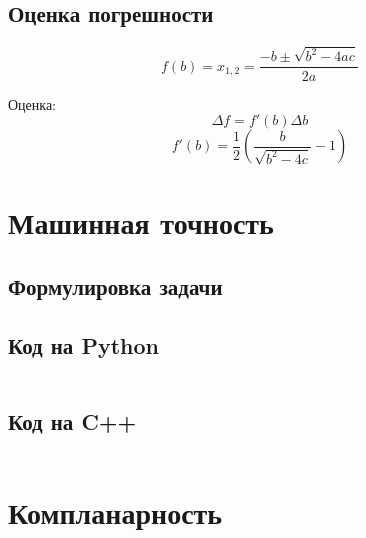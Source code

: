 \documentclass[a4paper,12pt]{article}
\newenvironment{longlisting}{\captionsetup{type=listing}}{}
\begin{document}
\subsection{Оценка погрешности}

$$f(b) = x_{1,2} = \frac{-b \pm \sqrt{b^2-4ac}}{2a}$$

Оценка:
$$\Delta f = f'(b)\Delta b$$
$$f'(b) = \frac{1}{2}(\frac{b}{\sqrt{b^2-4c}}-1)$$



\section{Машинная точность}
\subsection{Формулировка задачи}
\subsection{Код на Python}

\begin{longlisting}
\inputminted{python}{6.py}
\end{longlisting}

\subsection{Код на C++}

\begin{longlisting}
\inputminted{c++}{6.cpp}
\end{longlisting}

\section{Компланарность}

\begin{longlisting}
\inputminted{python}{1_10.py}
\end{longlisting}
\end{document}
